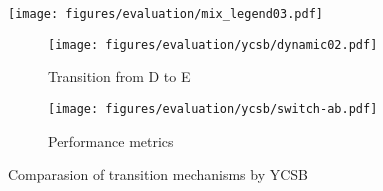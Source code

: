 \begin{figure}[t]
    \centering
    \begin{minipage}{0.95\linewidth}
        \centering
        \texttt{[image: figures/evaluation/mix\_legend03.pdf]}
        \vspace{-5mm}
    \end{minipage}
    \begin{minipage}{0.95\linewidth}
        \centering
        \begin{subfigure}{0.48\linewidth}
            \texttt{[image: figures/evaluation/ycsb/dynamic02.pdf]}
            \vspace{-6mm}
            \caption{Transition from D to E}
            \label{fig:evaluation.dynamic_switch.de}
            \vspace{-4mm}
        \end{subfigure}
        \begin{subfigure}{0.48\linewidth}
            \texttt{[image: figures/evaluation/ycsb/switch-ab.pdf]}
            \vspace{-6mm}
            \caption{Performance metrics}
            \label{fig:evaluation.dynamic_switch.metric}
            \vspace{-4mm}
        \end{subfigure}
    \end{minipage}
    \caption{Comparasion of transition mechanisms by YCSB}
    \label{fig:evaluation.dynamic_switch}
    \vspace{-6mm}
\end{figure}

